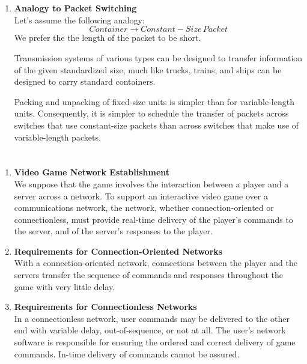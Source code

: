 \documentclass[12pt]{article}
\begin{document}
\section{}
    \begin{enumerate}[label=(\alph*)]
    \item \textbf{Analogy to Packet Switching} \\
    Let's assume the following analogy:
    \begin{equation*}
        Container \longrightarrow Constant-Size \, Packet
    \end{equation*}
    We prefer the the length of the packet to be short. 
    
    Transmission systems of various types can be designed to transfer information of the given standardized size, much like trucks, trains, and ships can be designed to carry standard containers. 
    
    Packing and unpacking of fixed-size units is simpler than for variable-length units. Consequently, it is simpler to schedule the transfer of packets across switches that use constant-size packets than across switches that make use of variable-length packets.
    \end{enumerate}
    
\section{}
    \begin{enumerate}[label=(\alph*)]
    \item \textbf{Video Game Network Establishment} \\
    We suppose that the game involves the interaction between a player and a
    server across a network. To support an interactive video game over a
    communications network, the network, whether connection-oriented or
    connectionless, must provide real-time delivery of the player's commands to
    the server, and of the server's responses to the player. 
    
    \item \textbf{Requirements for Connection-Oriented Networks} \\
    With a connection-oriented network, connections between the player and the servers transfer the sequence of commands and responses throughout the game with very little
    delay. 
    
    \item \textbf{Requirements for Connectionless Networks} \\
    In a connectionless network, user commands may be delivered to the
    other end with variable delay, out-of-sequence, or not at all. The user’s
    network software is responsible for ensuring the ordered and correct delivery
    of game commands. In-time delivery of commands cannot be assured.
    \end{enumerate} 
    
\end{document}
